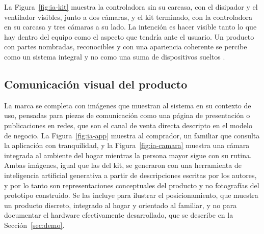 La Figura~\ref{fig:ia-kit} muestra la controladora sin su carcasa, con el disipador y el ventilador visibles, junto a dos cámaras, y el kit terminado, con la controladora en su carcasa y tres cámaras a su lado.
La intención es hacer visible tanto lo que hay dentro del equipo como el aspecto que tendría ante el usuario.
Un producto con partes nombradas, reconocibles y con una apariencia coherente se percibe como un sistema integral y no como una suma de dispositivos sueltos \parencite{Keller2013}.


\subsection{Comunicación visual del producto}
\label{sec:branding-comunicacion}

La marca se completa con imágenes que muestran al sistema en su contexto de uso, pensadas para piezas de comunicación como una página de presentación o publicaciones en redes, que son el canal de venta directa descripto en el modelo de negocio.
La Figura~\ref{fig:ia-app} muestra al comprador, un familiar que consulta la aplicación con tranquilidad, y la Figura~\ref{fig:ia-camara} muestra una cámara integrada al ambiente del hogar mientras la persona mayor sigue con su rutina.
Ambas imágenes, igual que las del kit, se generaron con una herramienta de inteligencia artificial generativa a partir de descripciones escritas por los autores, y por lo tanto son representaciones conceptuales del producto y no fotografías del prototipo construido.
Se las incluye para ilustrar el posicionamiento, que muestra un producto discreto, integrado al hogar y orientado al familiar, y no para documentar el hardware efectivamente desarrollado, que se describe en la Sección~\ref{sec:demo}.


